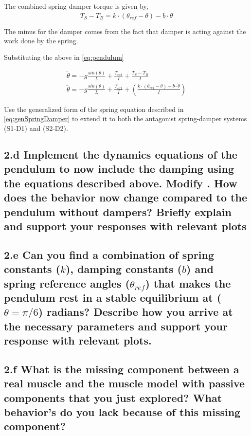 \documentclass{cmc}
\begin{document}
The combined spring damper torque is given by,
\begin{equation}
  \label{eq:spring_damper}
  T_{S} - T_{B} = k \cdot (\theta_{ref} - \theta) - b \cdot \dot{\theta}
\end{equation}

The minus for the damper comes from the fact that damper is acting
against the work done by the spring.

Substituting the above in \ref{eq:pendulum}

\begin{eqnarray}
  \label{eq:spring-damper}
  \ddot{\theta} = -g\frac{sin(\theta)}{L} + \frac{T_{ext}}{I} + \frac{T_{S} - T_{B}}{I} \\
  \ddot{\theta} = -g\frac{sin(\theta)}{L}+ \frac{T_{ext}}{I} + (\frac{k \cdot (\theta_{ref} - \theta) - b \cdot \dot{\theta}}{I}) \label{eq:genSpringDamper}
\end{eqnarray}

Use the generalized form of the spring equation described in
\ref{eq:genSpringDamper} to extend it to both the antagonist
spring-damper systems (S1-D1) and (S2-D2).


\subsection*{2.d Implement the dynamics equations of the pendulum to
  now include the damping using the equations described above. Modify
  .  How does the
  behavior now change compared to the pendulum without dampers? Briefly explain and support your
  responses with relevant plots}


\subsection*{2.e Can you find a combination of spring constants ($k$),
  damping constants ($b$) and spring reference angles ($\theta_{ref}$)
  that makes the pendulum rest in a stable equilibrium at
  ($\theta = \pi/6$) radians? Describe how you arrive at the necessary
  parameters and support your response with relevant plots.}


\subsection*{2.f What is the missing component between a real muscle
  and the muscle model with passive components that you just explored?
  What behavior's do you lack because of this missing component?}
\end{document}
